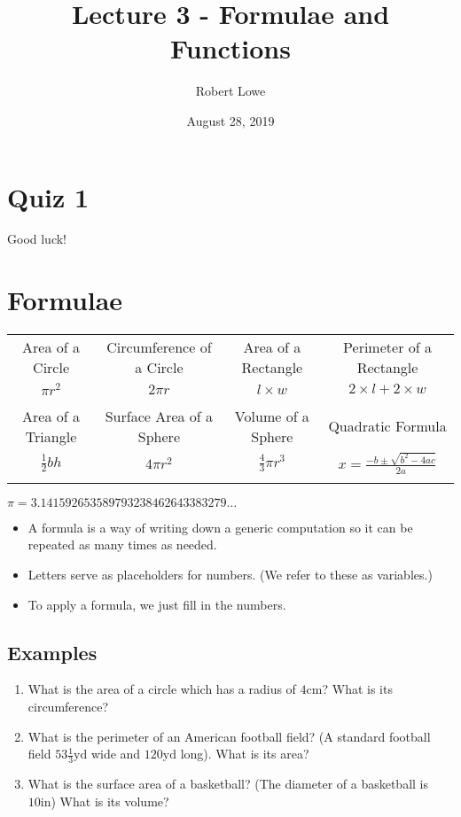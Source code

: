 \documentclass{article}
\title{Lecture 3 - Formulae and Functions}
\author{Robert Lowe}
\date{August 28, 2019}
\begin{document}
\maketitle

\section*{Quiz 1}
Good luck!

\section*{Formulae}
\begin{tabular}{|c|c|c|c|}
\hline
Area of a Circle & Circumference of a Circle & Area of a Rectangle & Perimeter of a Rectangle\\
$\pi r^2$ & $2\pi r$ & $l \times w$ & $2\times l + 2 \times w$\\
& & &\\
\hline
Area of a Triangle & Surface Area of a Sphere & Volume of a Sphere & Quadratic Formula\\
$\frac{1}{2}bh$ & $4 \pi r^2$ & $\frac{4}{3} \pi r ^3$ & $x = \displaystyle\frac{-b \pm \sqrt{b^2-4ac}}{2a}$\\
& & &\\
\hline
\end{tabular}\newline
$\pi=3.141592653589793238462643383279\ldots$

\begin{itemize}
\item A formula is a way of writing down a generic computation so it can be repeated 
 as many times as needed.
\item Letters serve as placeholders for numbers.  (We refer to these as variables.)
\item To apply a formula, we just fill in the numbers.
\end{itemize}

\subsection*{Examples}
\begin{enumerate}
\item What is the area of a circle which has a radius of $4\mathrm{cm}$? What is its circumference?
\item What is the perimeter of an American football field?  (A standard football field $53\frac{1}{3}\mathrm{yd}$ wide and $120 \mathrm{yd}$ long).  What is its area?
\item What is the surface area of a basketball? (The diameter of a basketball is $10\mathrm{in}$) What is its volume?
\end{enumerate}
\end{document}
